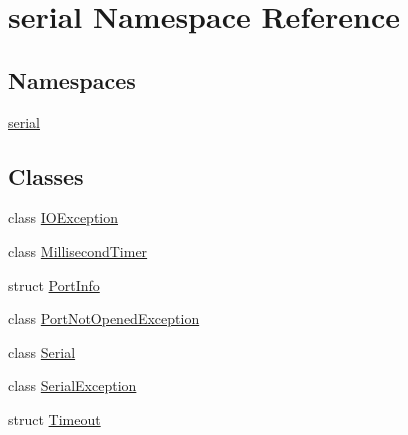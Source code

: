 \hypertarget{namespaceserial}{}\section{serial Namespace Reference}
\label{namespaceserial}
\subsection*{Namespaces}
\begin{DoxyCompactItemize}
\item 
 \mbox{\hyperlink{namespaceserial_1_1serial}{serial}}
\end{DoxyCompactItemize}
\subsection*{Classes}
\begin{DoxyCompactItemize}
\item 
class \mbox{\hyperlink{classserial_1_1_i_o_exception}{I\+O\+Exception}}
\item 
class \mbox{\hyperlink{classserial_1_1_millisecond_timer}{Millisecond\+Timer}}
\item 
struct \mbox{\hyperlink{structserial_1_1_port_info}{Port\+Info}}
\item 
class \mbox{\hyperlink{classserial_1_1_port_not_opened_exception}{Port\+Not\+Opened\+Exception}}
\item 
class \mbox{\hyperlink{classserial_1_1_serial}{Serial}}
\item 
class \mbox{\hyperlink{classserial_1_1_serial_exception}{Serial\+Exception}}
\item 
struct \mbox{\hyperlink{structserial_1_1_timeout}{Timeout}}
\end{DoxyCompactItemize}
